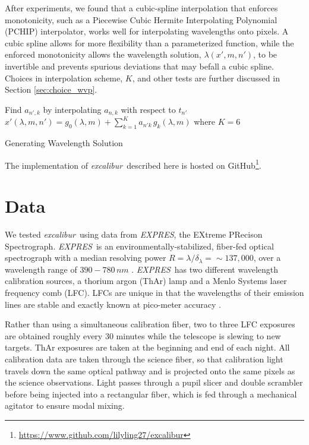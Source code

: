 \documentclass[twocolumn,table,xcolor,trackchanges]{aastex63}
\newcommand{\project}[1]{\textsl{#1}}
\newcommand{\name}{\project{excalibur}}
\newcommand{\acronym}[1]{{\small{#1}}}
\newcommand{\expres}{\project{\acronym{EXPRES}}}
\begin{document}
After experiments, we found that a cubic-spline interpolation that enforces monotonicity, such as a Piecewise Cubic Hermite Interpolating Polynomial (PCHIP) interpolator, works well for interpolating wavelengths onto pixels.  A cubic spline allows for more flexibility than a parameterized function, while the enforced monotonicity allows the wavelength solution, $\lambda(x',m,n')$, to be invertible and prevents spurious deviations that may befall a cubic spline.  Choices in interpolation scheme, $K$, and other tests are further discussed in Section \ref{sec:choice_wvp}.

\begin{algorithm}
\SetAlgoLined
{}

Find $a_{n',k}$ by interpolating $a_{n,k}$ with respect to $t_{n'}$\;
$x'(\lambda,m,n') = g_0(\lambda,m) + \sum_{k=1}^K a_{n'k}\,g_k(\lambda,m)$ where $K=6$\;
\caption{Generating Wavelength Solution}
\end{algorithm}

The implementation of \name\ described here is hosted on GitHub\footnote{\url{https://www.github.com/lilyling27/excalibur}}.

\section{Data} \label{sec:data}
We tested \name\ using data from \expres, the EXtreme PRecison Spectrograph.  \expres\ is an environmentally-stabilized, fiber-fed optical spectrograph with a median resolving power $R=\lambda/\delta_{\lambda}=\sim137,000$, over a wavelength range of $390-780\, nm$ \citep{jurgenson2016, blackman2020}.  \expres\ has two different wavelength calibration sources, a thorium argon (ThAr) lamp and a Menlo Systems laser frequency comb (LFC).  LFCs are unique in that the wavelengths of their emission lines are stable and exactly known at pico-meter accuracy \citep{wilken2012, molaro2013, probst2014}.

Rather than using a simultaneous calibration fiber, two to three LFC exposures are obtained roughly every 30 minutes while the telescope is slewing to new targets.  ThAr exposures are taken at the beginning and end of each night.  All calibration data are taken through the science fiber, so that calibration light travels down the same optical pathway and is projected onto the same pixels as the science observations.  Light passes through a pupil slicer and double scrambler before being injected into a rectangular fiber, which is fed through a mechanical agitator to ensure modal mixing\citep{petersburg2018}.
\end{document}
